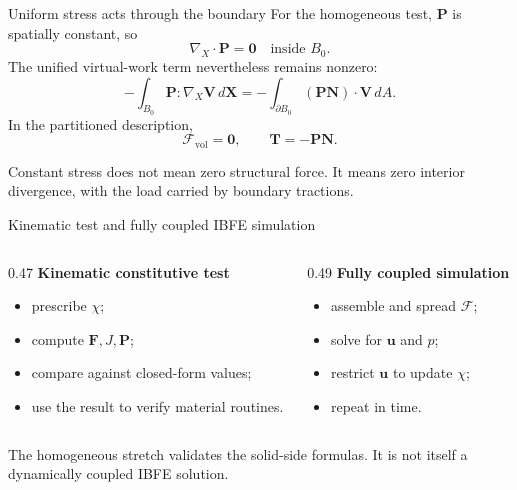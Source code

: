 \documentclass[aspectratio=169,11pt]{beamer}
\newcommand{\Xvec}{\bm{X}}
\newcommand{\uvec}{\bm{u}}
\newcommand{\Fvec}{\bm{\mathcal{F}}}
\newcommand{\Tvec}{\bm{T}}
\newcommand{\Vvec}{\bm{V}}
\newcommand{\Nvec}{\bm{N}}
\newcommand{\Ften}{\bm{F}}
\newcommand{\Pten}{\bm{P}}
\newcommand{\Grad}{\nabla_{\!X}}
\newcommand{\Div}{\nabla_{\!X}\!\cdot}
\begin{document}
\begin{frame}{Uniform stress acts through the boundary}
For the homogeneous test, \(\Pten\) is spatially constant, so
\[
  \Div\Pten=\bm{0}
  \quad\text{inside }B_0.
\]
The unified virtual-work term nevertheless remains nonzero:
\[
  -\int_{B_0}\Pten:\Grad\Vvec\,d\Xvec
  =
  -\int_{\partial B_0}(\Pten\Nvec)\cdot\Vvec\,dA .
\]
In the partitioned description,
\[
  \Fvec_{\mathrm{vol}}=\bm{0},
  \qquad
  \Tvec=-\Pten\Nvec .
\]
\begin{punchbox}
\small Constant stress does not mean zero structural force. It means zero interior divergence, with the load carried by boundary tractions.
\end{punchbox}
\end{frame}

\begin{frame}{Kinematic test and fully coupled IBFE simulation}
\begin{columns}[T,onlytextwidth]
\begin{column}{0.47\textwidth}
\textbf{Kinematic constitutive test}
\begin{itemize}\itemsep6pt
  \item prescribe \(\chi\);
  \item compute \(\Ften,J,\Pten\);
  \item compare against closed-form values;
  \item use the result to verify material routines.
\end{itemize}
\end{column}
\begin{column}{0.49\textwidth}
\textbf{Fully coupled simulation}
\begin{itemize}\itemsep6pt
  \item assemble and spread \(\Fvec\);
  \item solve for \(\uvec\) and \(p\);
  \item restrict \(\uvec\) to update \(\chi\);
  \item repeat in time.
\end{itemize}
\end{column}
\end{columns}
\medskip
\begin{punchbox}
\small The homogeneous stretch validates the solid-side formulas. It is not itself a dynamically coupled IBFE solution.
\end{punchbox}
\end{frame}
\end{document}

